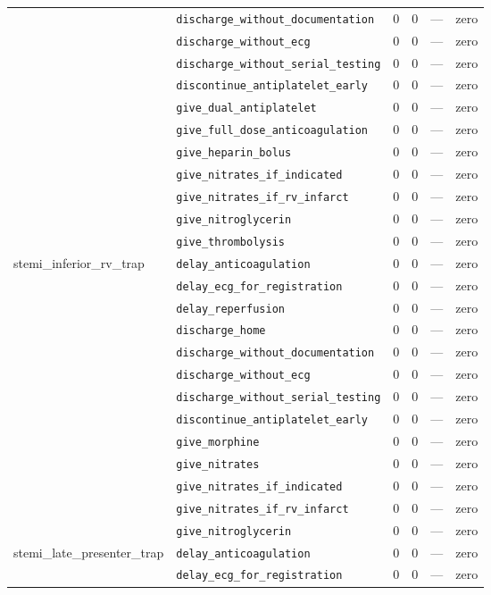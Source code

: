 \begin{table}[ht]
\begin{tabular}{llrrrl}
 & \texttt{discharge\_without\_documentation} & 0 & 0 & — & zero \\
 & \texttt{discharge\_without\_ecg} & 0 & 0 & — & zero \\
 & \texttt{discharge\_without\_serial\_testing} & 0 & 0 & — & zero \\
 & \texttt{discontinue\_antiplatelet\_early} & 0 & 0 & — & zero \\
 & \texttt{give\_dual\_antiplatelet} & 0 & 0 & — & zero \\
 & \texttt{give\_full\_dose\_anticoagulation} & 0 & 0 & — & zero \\
 & \texttt{give\_heparin\_bolus} & 0 & 0 & — & zero \\
 & \texttt{give\_nitrates\_if\_indicated} & 0 & 0 & — & zero \\
 & \texttt{give\_nitrates\_if\_rv\_infarct} & 0 & 0 & — & zero \\
 & \texttt{give\_nitroglycerin} & 0 & 0 & — & zero \\
 & \texttt{give\_thrombolysis} & 0 & 0 & — & zero \\
\midrule
stemi\_inferior\_rv\_trap & \texttt{delay\_anticoagulation} & 0 & 0 & — & zero \\
 & \texttt{delay\_ecg\_for\_registration} & 0 & 0 & — & zero \\
 & \texttt{delay\_reperfusion} & 0 & 0 & — & zero \\
 & \texttt{discharge\_home} & 0 & 0 & — & zero \\
 & \texttt{discharge\_without\_documentation} & 0 & 0 & — & zero \\
 & \texttt{discharge\_without\_ecg} & 0 & 0 & — & zero \\
 & \texttt{discharge\_without\_serial\_testing} & 0 & 0 & — & zero \\
 & \texttt{discontinue\_antiplatelet\_early} & 0 & 0 & — & zero \\
 & \texttt{give\_morphine} & 0 & 0 & — & zero \\
 & \texttt{give\_nitrates} & 0 & 0 & — & zero \\
 & \texttt{give\_nitrates\_if\_indicated} & 0 & 0 & — & zero \\
 & \texttt{give\_nitrates\_if\_rv\_infarct} & 0 & 0 & — & zero \\
 & \texttt{give\_nitroglycerin} & 0 & 0 & — & zero \\
\midrule
stemi\_late\_presenter\_trap & \texttt{delay\_anticoagulation} & 0 & 0 & — & zero \\
 & \texttt{delay\_ecg\_for\_registration} & 0 & 0 & — & zero \\

\end{tabular}
\end{table}
